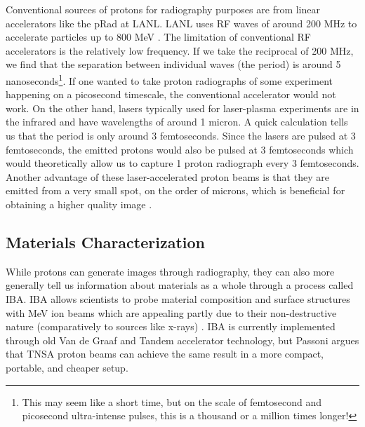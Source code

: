 Conventional sources of protons for radiography purposes are from linear accelerators like the pRad at \gls{LANL}. \gls{LANL} uses \gls{RF} waves of around 200 MHz to accelerate particles up to 800 MeV \cite{LANL_PRAD}. The limitation of conventional \gls{RF} accelerators is the relatively low frequency. If we take the reciprocal of 200 MHz, we find that the separation between individual waves (the period) is around 5 nanoseconds\footnote{This may seem like a short time, but on the scale of femtosecond and picosecond ultra-intense pulses, this is a thousand or a million times longer!}. If one wanted to take proton radiographs of some experiment happening on a picosecond timescale, the conventional accelerator would not work. On the other hand, lasers typically used for laser-plasma experiments are in the infrared and have wavelengths of around 1 micron. A quick calculation tells us that the period is only around 3 femtoseconds. Since the lasers are pulsed at 3 femtoseconds, the emitted protons would also be pulsed at 3 femtoseconds which would theoretically allow us to capture 1 proton radiograph every 3 femtoseconds. Another advantage of these laser-accelerated proton beams is that they are emitted from a very small spot, on the order of microns, which is beneficial for obtaining a higher quality image \cite{Schaeffer_2023_RevMod}.

\subsection{Materials Characterization}

While protons can generate images through radiography, they can also more generally tell us information about materials as a whole through a process called \gls{IBA}. \gls{IBA} allows scientists to probe material composition and surface structures with MeV ion beams which are appealing partly due to their non-destructive nature (comparatively to sources like x-rays) \cite{Passoni_2019_SciRep}. \gls{IBA} is currently implemented through old Van de Graaf and Tandem accelerator technology, but Passoni \cite{Passoni_2019_SciRep} argues that \gls{TNSA} proton beams can achieve the same result in a more compact, portable, and cheaper setup.


